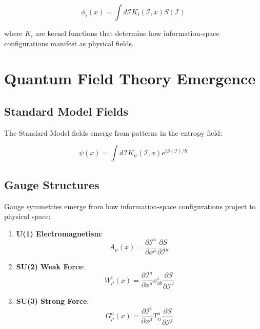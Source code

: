 \documentclass{article}
\begin{document}
\begin{equation}
\phi_i(x) = \int d\mathcal{I} K_i(\mathcal{I}, x) S(\mathcal{I})
\end{equation}

where $K_i$ are kernel functions that determine how information-space configurations manifest as physical fields.

\section{Quantum Field Theory Emergence}

\subsection{Standard Model Fields}

The Standard Model fields emerge from patterns in the entropy field:

\begin{equation}
\psi(x) = \int d\mathcal{I} K_\psi(\mathcal{I}, x) e^{iS(\mathcal{I})/\hbar}
\end{equation}

\subsection{Gauge Structures}

Gauge symmetries emerge from how information-space configurations project to physical space:

\begin{enumerate}
\item \textbf{U(1) Electromagnetism}:
   \begin{equation}
   A_\mu(x) = \frac{\partial \mathcal{I}^a}{\partial x^\mu} \frac{\partial S}{\partial \mathcal{I}^a}
   \end{equation}

\item \textbf{SU(2) Weak Force}:
   \begin{equation}
   W_\mu^i(x) = \frac{\partial \mathcal{I}^a}{\partial x^\mu}\sigma^i_{ab}\frac{\partial S}{\partial \mathcal{I}^b}
   \end{equation}

\item \textbf{SU(3) Strong Force}:
   \begin{equation}
   G_\mu^a(x) = \frac{\partial \mathcal{I}^i}{\partial x^\mu}T^a_{ij}\frac{\partial S}{\partial \mathcal{I}^j}
   \end{equation}
\end{enumerate}
\end{document}
